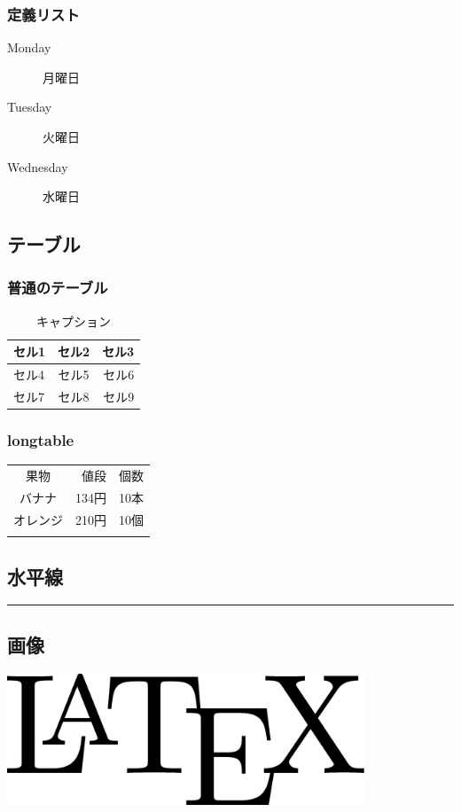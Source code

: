 \subsubsection{定義リスト}
\begin{description}
\item[Monday] 月曜日
\item[Tuesday] 火曜日
\item[Wednesday] 水曜日
\end{description}

\subsection{テーブル}

\subsubsection{普通のテーブル}
\begin{table}[htbp]
\begin{center}
\begin{tabular}{|l|c|r|}
\hline
セル1 & セル2 & セル3 \\ \hline
セル4 & セル5 & セル6 \\ \hline
セル7 & セル8 & セル9 \\ \hline
\end{tabular}
\caption{キャプション}
\end{center}
\end{table}

\subsubsection{longtable}
\begin{longtable}[c]{@{}crr@{}}
\toprule\addlinespace
果物 & 値段 & 個数
\\\addlinespace
\midrule\endhead
バナナ & 134円 & 10本
\\\addlinespace
オレンジ & 210円 & 10個
\\\addlinespace
\bottomrule
\end{longtable}

\subsection{水平線}
\begin{center}\rule{\textwidth}{.5pt}\end{center}

\subsection{画像}
\includegraphics[width=0.8\textwidth]{latex.eps}

